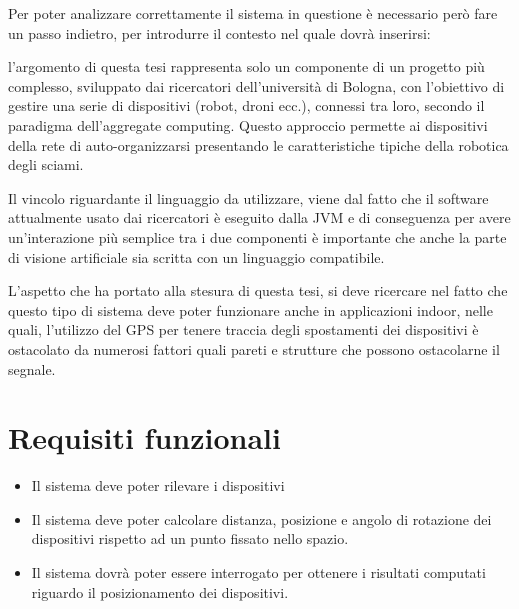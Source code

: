 \documentclass[12pt,a4paper,openright,twoside]{book}
\begin{document}
Per poter analizzare correttamente il sistema in questione è necessario però fare un passo indietro, per introdurre il contesto nel quale dovrà inserirsi:
\begin{adjustwidth}{1cm}{0cm}
l'argomento di questa tesi rappresenta solo un componente di un progetto più complesso, sviluppato dai ricercatori dell'università di Bologna, con l'obiettivo di gestire una serie di dispositivi (robot, droni ecc.), connessi tra loro, secondo il paradigma dell'aggregate computing.
Questo approccio permette ai dispositivi della rete di auto-organizzarsi presentando le caratteristiche tipiche della robotica degli sciami.

Il vincolo riguardante il linguaggio da utilizzare, viene dal fatto che il software attualmente usato dai ricercatori è eseguito dalla JVM e di conseguenza per avere un'interazione più semplice tra i due componenti è importante che anche la parte di visione artificiale sia scritta con un linguaggio compatibile.
\end{adjustwidth}

L'aspetto che ha portato alla stesura di questa tesi, si deve ricercare nel fatto che questo tipo di sistema deve poter funzionare anche in applicazioni indoor, nelle quali, l'utilizzo del GPS per tenere traccia degli spostamenti dei dispositivi è ostacolato da numerosi fattori quali pareti e strutture che possono ostacolarne il segnale.


\section{Requisiti funzionali} \label{sec:requisiti_funzionali}
\begin{itemize}
	\item Il sistema deve poter rilevare i dispositivi
	\item Il sistema deve poter calcolare distanza, posizione e angolo di rotazione dei dispositivi rispetto ad un punto fissato nello spazio.
	\item Il sistema dovrà poter essere interrogato per ottenere i risultati computati riguardo il posizionamento dei dispositivi.
\end{itemize}
\end{document}
